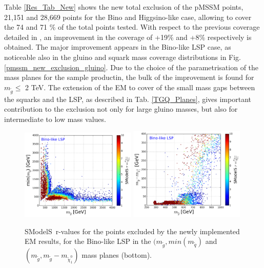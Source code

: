\documentclass[a4paper,10pt]{article}
\newcommand{\SMO}{{\sc SModelS}}
\begin{document}
%
Table \ref{Res_Tab_New} shows the new total exclusion of the pMSSM points, 21,151 and 28,669 points for the Bino and Higgsino-like case, allowing to cover the 74 and 71 $\%$ of the total points tested. With respect to the previous coverage detailed in \cite{Ambrogi:2017lov}, an improvement in the coverage of +19$\%$ and +8$\%$ respectively is obtained.
%
The major improvement appears in the Bino-like LSP case, as noticeable also in the gluino and squark mass coverage distributions in Fig. \ref{pmssm_new_exclusion_gluino}. Due to the choice of the parametrisation of the mass planes for the sample productin, the bulk of the improvement is found for $m_{\tilde g}\leq$ 2 TeV. The extension of the EM to cover of the small mass gaps between the squarks and the LSP, as described in Tab. \ref{TGQ_Planes}, gives important contribution to the exclusion not only for large gluino masses, but also for intermediate to low mass values.
\begin{figure}[!]
\begin{center}
\subfigure
\includegraphics[width=0.49\textwidth]{PLOTS/BINO_rValus_Glu_Sq.png}
\subfigure
{\includegraphics[width=0.49\textwidth]{PLOTS/BINO_rValus_Glu_Diff_Neu.png}}
\end{center}
\caption{\SMO~r-values for the points excluded by the newly implemented EM results, for the Bino-like LSP in the $(m_{\tilde{g}},min(m_{\tilde q})$ and $(m_{\tilde{g}}, m_{\tilde{g}} - m_{\tilde \chi _1 ^0 })$ mass planes (bottom).} 
\label{rValues}
\end{figure}
\end{document}
